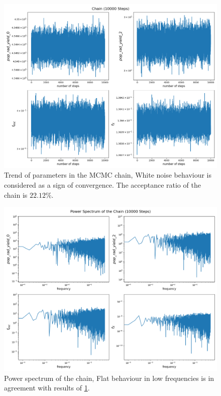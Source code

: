 \documentclass[12pt, TexShade, letterpaper]{report}
\begin{document}
\begin{figure}[h!]
\centering
\includegraphics[scale =0.5]{chain_edges.png}
\caption[Trend of parameters]{Trend of parameters in the MCMC chain, White noise behaviour is considered as a sign of convergence. The acceptance ratio of the chain is $22.12\%.$}
\label{fig:chain_known_curve}
\end{figure}

\begin{figure}[h!]
\centering
\includegraphics[scale =0.5]{power_spectrum_edges.png}
\caption[Power spectrum of the chain]{Power spectrum of the chain, Flat behaviour in low frequencies is in agreement with results of \ref{fig:chain_known_curve}.}
\label{fig:power_spectrum_known_curve}
\end{figure}
\end{document}
